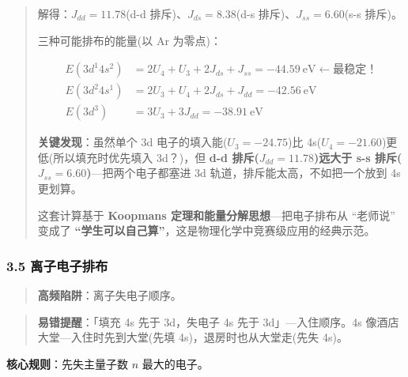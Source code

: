 \begin{quote}
解得：\(J_{dd} = 11.78\)(d-d 排斥)、\(J_{ds} = 8.38\)(d-s 排斥)、\(J_{ss} = 6.60\)(s-s 排斥)。

三种可能排布的能量(以 Ar 为零点)：

\[\begin{aligned}
E(3d^1 4s^2) &= 2U_4 + U_3 + 2J_{ds} + J_{ss} = -44.59\ \mathrm{eV} \leftarrow \text{最稳定！}\\
E(3d^2 4s^1) &= 2U_3 + U_4 + 2J_{ds} + J_{dd} = -42.56\ \mathrm{eV}\\
E(3d^3)      &= 3U_3 + 3J_{dd} = -38.91\ \mathrm{eV}
\end{aligned}\]

\textbf{关键发现}：虽然单个 3d 电子的填入能(\(U_3 = -24.75\))比 4s(\(U_4 = -21.60\))更低(所以填充时优先填入 3d？)，但 \textbf{d-d 排斥(\(J_{dd} = 11.78\))远大于 s-s 排斥(\(J_{ss} = 6.60\))}---把两个电子都塞进 3d 轨道，排斥能太高，不如把一个放到 4s 更划算。

这套计算基于 \textbf{Koopmans 定理和能量分解思想}---把电子排布从 ``老师说'' 变成了 \textbf{``学生可以自己算''}，这是物理化学中竞赛级应用的经典示范。
\end{quote}

\subsubsection{3.5 离子电子排布}\label{ux79bbux5b50ux7535ux5b50ux6392ux5e03}

\begin{quote}
\textbf{高频陷阱}：离子失电子顺序。
\end{quote}

\begin{quote}
\textbf{易错提醒}：「填充 4s 先于 3d，失电子 4s 先于 3d」---入住顺序。4s 像酒店大堂---入住时先到大堂(先填 4s)，退房时也从大堂走(先失 4s)。
\end{quote}

\textbf{核心规则}：先失主量子数 \(n\) 最大的电子。

